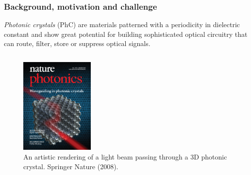 \begin{frame}
  \frametitle{Background, motivation and challenge}

  \emph{Photonic crystals} (PhC) are materials patterned with a periodicity in dielectric constant
  and show great potential for building sophisticated optical circuitry that can
  route, filter, store or suppress optical signals.
  \bigskip
  
  \begin{columns}[T]
    
    \hskip0.5cm
    \pause
    \begin{column}{0.3\textwidth}
      \begin{figure}
        \centering 
        \includegraphics[height=4.8cm]{../imgs/photonics_cover.jpg} 
        \caption{An artistic rendering of a light beam passing through a 3D photonic crystal.
          \textcopyright \enspace Springer Nature (2008).}
      \end{figure}
    \end{column}
  \end{columns}
  
\end{frame}

